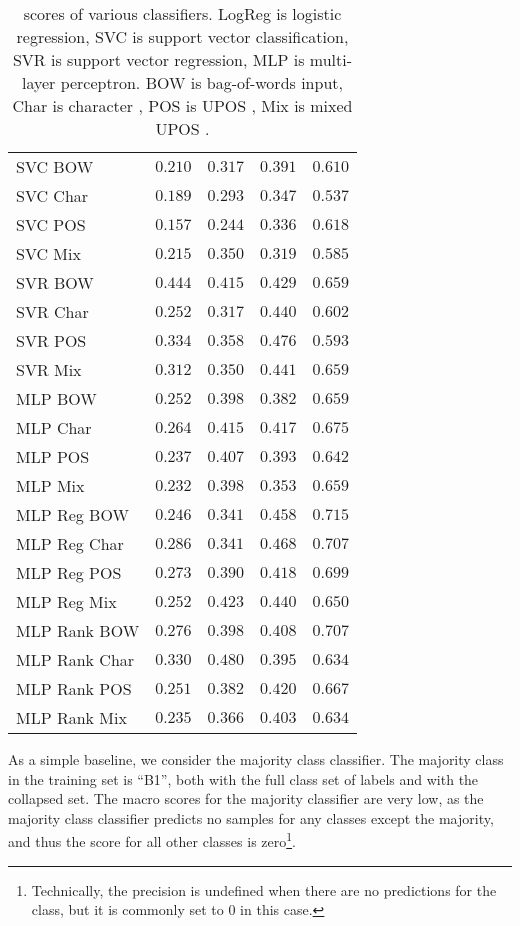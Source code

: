 \begin{table}
\begin{tabular}{lrrrr}
    \midrule
    SVC BOW & $0.210$ & $0.317$ & $0.391$ & $0.610$ \\
    SVC Char & $0.189$ & $0.293$ & $0.347$ & $0.537$ \\
    SVC POS & $0.157$ & $0.244$ & $0.336$ & $0.618$ \\
    SVC Mix & $0.215$ & $0.350$ & $0.319$ & $0.585$ \\
    \midrule
    SVR BOW & $\mathbf{0.444}$ & $0.415$ & $0.429$ & $0.659$ \\
    SVR Char & $0.252$ & $0.317$ & $0.440$ & $0.602$ \\
    SVR POS & $0.334$ & $0.358$ & $\mathbf{0.476}$ & $0.593$ \\
    SVR Mix & $0.312$ & $0.350$ & $0.441$ & $0.659$ \\
    \midrule
    MLP BOW & $0.252$ & $0.398$ & $0.382$ & $0.659$ \\
    MLP Char & $0.264$ & $0.415$ & $0.417$ & $0.675$ \\
    MLP POS & $0.237$ & $0.407$ & $0.393$ & $0.642$ \\
    MLP Mix & $0.232$ & $0.398$ & $0.353$ & $0.659$ \\
    \midrule
    MLP Reg BOW & $0.246$ & $0.341$ & $0.458$ & $\mathbf{0.715}$ \\
    MLP Reg Char & $0.286$ & $0.341$ & $0.468$ & $0.707$ \\
    MLP Reg POS & $0.273$ & $0.390$ & $0.418$ & $0.699$ \\
    MLP Reg Mix & $0.252$ & $0.423$ & $0.440$ & $0.650$ \\
    \midrule
    MLP Rank BOW & $0.276$ & $0.398$ & $0.408$ & $0.707$ \\
    MLP Rank Char & $0.330$ & $\mathbf{0.480}$ & $0.395$ & $0.634$ \\
    MLP Rank POS & $0.251$ & $0.382$ & $0.420$ & $0.667$ \\
    MLP Rank Mix & $0.235$ & $0.366$ & $0.403$ & $0.634$ \\
    \bottomrule
  \end{tabular}
  \caption[\FI scores of linear and neural classifiers]{
    \FI scores of various classifiers. LogReg is logistic regression, SVC is
    support vector classification, SVR is support vector regression, MLP is
    multi-layer perceptron. BOW is bag-of-words input, Char is character
    \ngrams, POS is UPOS \ngrams, Mix is mixed UPOS \ngrams.
  }
  \label{tab:baseline-accuracies}
\end{table}

As a simple baseline, we consider the majority class classifier. The majority
class in the training set is ``B1'', both with the full class set of labels
and with the collapsed set. The macro \FI scores for the majority classifier
are very low, as the majority class classifier predicts no samples for any
classes except the majority, and thus the \FI score for all other classes is
zero\footnote{Technically, the precision is undefined when there are no
predictions for the class, but it is commonly set to 0 in this case.}.


